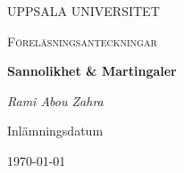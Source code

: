 \begin{titlepage}

  \centering
	{\scshape\LARGE UPPSALA UNIVERSITET\par}
	\vspace{1cm}
  {\scshape\Large {Föreläsningsanteckningar} \par}
	\vspace{1.5cm}
  {\huge\bfseries {Sannolikhet \& Martingaler} \par}
	\vspace{2cm}
	{\Large\itshape Rami Abou Zahra \par}
	\vfill
  \vfill


  {\large Inlämningsdatum}\par
  {\today}

\end{titlepage}
